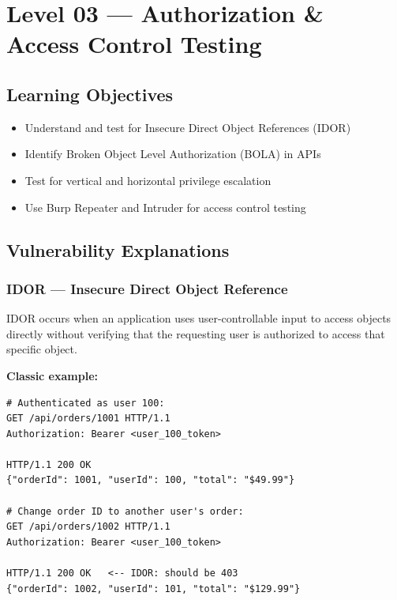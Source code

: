 \chapter{Level 03 — Authorization \& Access Control Testing}
\label{ch:level03}


\section{Learning Objectives}
\begin{itemize}
  \item Understand and test for Insecure Direct Object References (IDOR)
  \item Identify Broken Object Level Authorization (BOLA) in APIs
  \item Test for vertical and horizontal privilege escalation
  \item Use Burp Repeater and Intruder for access control testing
\end{itemize}

\section{Vulnerability Explanations}

\subsection{IDOR — Insecure Direct Object Reference}
IDOR occurs when an application uses user-controllable input to access objects directly without verifying that the requesting user is authorized to access that specific object.

\textbf{Classic example:}
\begin{lstlisting}[style=http, caption={IDOR in URL parameter}]
# Authenticated as user 100:
GET /api/orders/1001 HTTP/1.1
Authorization: Bearer <user_100_token>

HTTP/1.1 200 OK
{"orderId": 1001, "userId": 100, "total": "$49.99"}

# Change order ID to another user's order:
GET /api/orders/1002 HTTP/1.1
Authorization: Bearer <user_100_token>

HTTP/1.1 200 OK   <-- IDOR: should be 403
{"orderId": 1002, "userId": 101, "total": "$129.99"}
\end{lstlisting}


